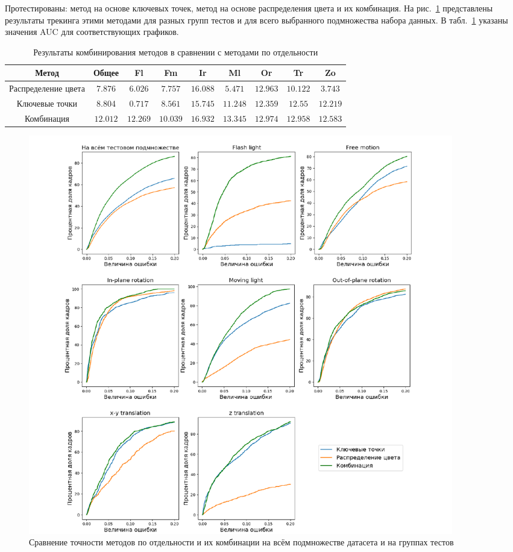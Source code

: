 Протестированы: метод на основе ключевых точек, метод на основе
распределения цвета и их комбинация.
На рис.~\ref{fig:combining-plots} представлены результаты трекинга этими
методами для разных групп тестов и для всего выбранного подмножества набора
данных.
В табл.~\ref{tab:combine} указаны значения AUC для соответствующих графиков.

\begin{table}[h]
\caption{\label{tab:combine}Результаты комбинирования методов в сравнении с
методами по отдельности}
\begin{center}
\begin{tabular}{|c|c|c|c|c|c|c|c|c|}
\hline
Метод & Общее & Fl & Fm & Ir & Ml & Or & Tr & Zo \\
\hline
Распределение цвета & 7.876 & $6.026$ & $7.757$ & $16.088$ & $5.471$ & $12.963$
&
$10.122$ & $3.743$ \\
\hline
Ключевые точки & 8.804 & $0.717$ & $8.561$ & $15.745$ & $11.248$ & $12.359$ &
$12.55$
&$12.219$ \\
\hline
Комбинация & $\mathbf{12.012}$ & $\mathbf{12.269}$ & $\mathbf{10.039}$ &
$\mathbf{16.932}$ &
$\mathbf{13.345}$ & $\mathbf{12.974}$ & $\mathbf{12.958}$ &
$\mathbf{12.583}$ \\
\hline
\end{tabular}
\end{center}
\end{table}

\begin{figure}
\centering
\includegraphics[width=0.9\textwidth]{fig/Combining.pdf}
\caption{
Сравнение точности методов по отдельности и их комбинации на всём подмножестве
датасета и на группах тестов
}
\label{fig:combining-plots}
\end{figure}


